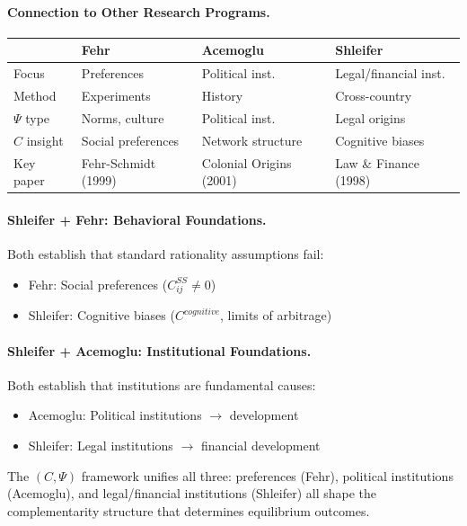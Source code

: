 \paragraph{Connection to Other Research Programs.}

\begin{center}
\renewcommand{\arraystretch}{1.2}
\begin{tabular}{llll}
\hline
& \textbf{Fehr} & \textbf{Acemoglu} & \textbf{Shleifer} \\
\hline
Focus & Preferences & Political inst. & Legal/financial inst. \\
Method & Experiments & History & Cross-country \\
$\Psi$ type & Norms, culture & Political inst. & Legal origins \\
$C$ insight & Social preferences & Network structure & Cognitive biases \\
Key paper & Fehr-Schmidt (1999) & Colonial Origins (2001) & Law \& Finance (1998) \\
\hline
\end{tabular}
\end{center}

\paragraph{Shleifer + Fehr: Behavioral Foundations.}
Both establish that standard rationality assumptions fail:
\begin{itemize}
  \item Fehr: Social preferences ($C^{SS}_{ij} \neq 0$)
  \item Shleifer: Cognitive biases ($C^{cognitive}$, limits of arbitrage)
\end{itemize}

\paragraph{Shleifer + Acemoglu: Institutional Foundations.}
Both establish that institutions are fundamental causes:
\begin{itemize}
  \item Acemoglu: Political institutions $\to$ development
  \item Shleifer: Legal institutions $\to$ financial development
\end{itemize}

The $(C, \Psi)$ framework unifies all three: preferences (Fehr), political
institutions (Acemoglu), and legal/financial institutions (Shleifer) all
shape the complementarity structure that determines equilibrium outcomes.

